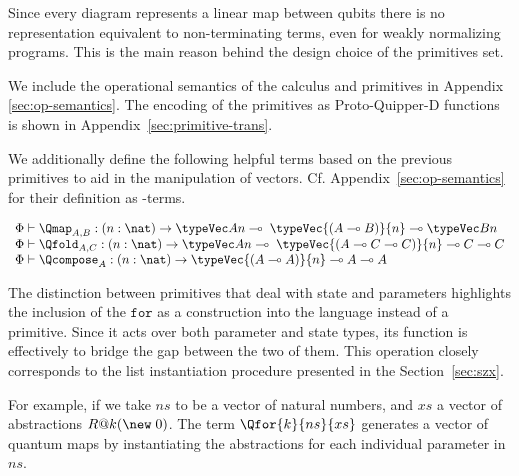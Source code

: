 Since every diagram represents a linear map between qubits there is no
representation equivalent to non-terminating terms, even for weakly normalizing
programs. This is the main reason behind the design choice of the primitives
set.

We include the operational semantics of the calculus and primitives in Appendix~
\ref{sec:op-semantics}. The encoding of the primitives as Proto-Quipper-D functions
is shown in Appendix~\ref{sec:primitive-trans}. 

We additionally define the following helpful terms based on the previous
primitives to aid in the manipulation of vectors.
Cf. Appendix~\ref{sec:op-semantics} for their definition as \lambdaD-terms.

\[
\begin{array}{l}
    \Phi\vdash \Qmap_{A,B} : (n:\nat) \to \typeVec A n \multimap\; \typeVec{(A \multimap B)}{n} \multimap \typeVec B n \\
    \Phi\vdash \Qfold_{A,C} : (n:\nat) \to \typeVec A n \multimap\; \typeVec{(A \multimap C \multimap C)}{n} \multimap C \multimap C \\
    \Phi\vdash \Qcompose_{A} : (n:\nat) \to \typeVec{(A \multimap A)}{n} \multimap A \multimap A \\
\end{array}
\]

The distinction between primitives that deal with state and parameters highlights the inclusion of the $\mathtt{for}$ as a construction into the language instead of a primitive. Since it acts over both parameter and state types, its function is effectively to bridge the gap between the two of them. This operation closely corresponds to the list instantiation procedure presented in the Section~\ref{sec:szx}.

For example, if we take $ns$ to be a vector of natural numbers, and $xs$ a vector of abstractions $R @k (\new\; 0)$. The term $\Qfor{k}{ns}{xs}$ generates a vector of quantum maps by instantiating the abstractions for each individual parameter in $ns$.
